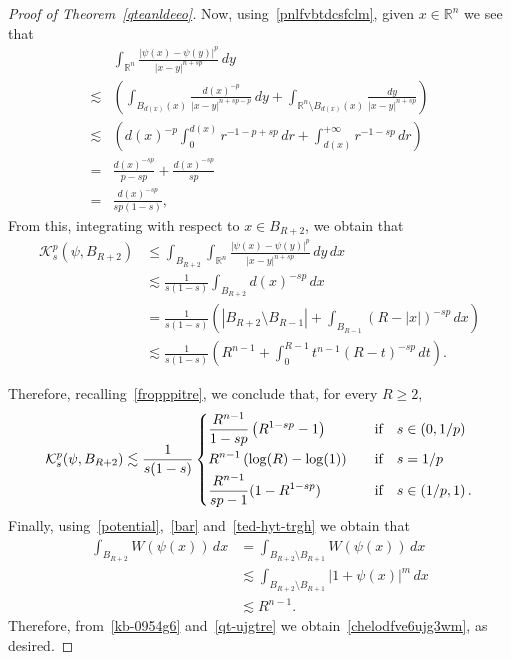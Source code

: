 \documentclass[12pt]{article}
\newcommand{\R}{\mathbb{R}}
\numberwithin{equation}{section}
\renewcommand{\leq}{\leqslant}
\renewcommand{\geq}{\geqslant}
\begin{document}
\begin{proof}[Proof of Theorem~\ref{qteanldeeo}]
Now, using~\eqref{pnlfvbtdcsfclm}, given $x\in\R^n$ we see that
\begin{equation*}
\begin{split}
&\int_{\R^n}\frac{\left|\psi(x)-\psi(y)\right|^p}{\left|x-y\right|^{n+sp}}\,dy\\
\lesssim & \left(\int_{B_{d(x)}(x)} \frac{d(x)^{-p}}{\left|x-y\right|^{n+sp-p}}\,dy+\int_{\R^n\setminus B_{d(x)}(x)} \frac{dy}{\left|x-y\right|^{n+sp}}\right)\\
\lesssim & \left( d(x)^{-p} \int_{0}^{d(x)}r^{-1-p+sp}\,dr+\int_{d(x)}^{+\infty} r^{-1-sp}\,dr\right) \\
=& \frac{d(x)^{-sp}}{p-sp} + \frac{d(x)^{-sp}}{sp} \\  
=& \frac{d(x)^{-sp}}{sp(1-s)},
\end{split}
\end{equation*}
From this, integrating with respect to $x\in B_{R+2}$, we obtain that
\begin{equation*}
\begin{split}
\mathcal{K}_s^p(\psi,B_{R+2}) &\leq \int_{B_{R+2}}\int_{\R^n}\frac{\left|\psi(x)-\psi(y)\right|^p}{\left|x-y\right|^{n+sp}}\,dy\,dx\\
&\lesssim\frac{1}{s(1-s)}\int_{B_{R+2}}d(x)^{-sp}\,dx\\
&= \frac{1}{s(1-s)}\left(\left|B_{R+2}\setminus B_{R-1}\right| +\int_{B_{R-1}}\left(R-\left|x\right|\right)^{-sp}\,dx\right)\\
&\lesssim \frac{1}{s(1-s)}\left( R^{n-1}+ \int_{0}^{R-1}t^{n-1}\left(R-t\right)^{-sp}\,dt\right).
\end{split}
\end{equation*}

Therefore, recalling~\eqref{fropppitre}, we conclude  that, for every $R\geq 2$, 
\begin{equation}\label{kb-0954g6}
\mathcal{K}_s^p(\psi,B_{R+2})\lesssim \frac{1}{s(1-s)}\begin{dcases}
\frac{R^{n-1}}{1-sp} \left(R^{1-sp}-1\right)\quad &\mbox{if}\quad s\in \left(0,1/p\right)\\
R^{n-1} \left(\log(R)-\log(1)\right)\quad &\mbox{if}\quad s=1/p\\
\frac{R^{n-1}}{sp-1}(1-R^{1-sp})\quad &\mbox{if}\quad s\in \left(1/p,1\right).
\end{dcases}
\end{equation} 
Finally, using~\eqref{potential},~\eqref{bar} and~\eqref{ted-hyt-trgh} we obtain that 
\begin{equation}\label{qt-ujgtre}
\begin{split}
\int_{B_{R+2}}W(\psi(x))\,dx &=\int_{B_{R+2}\setminus B_{R+1}}W(\psi(x))\,dx\\
&\lesssim  \int_{B_{R+2}\setminus B_{R+1}}\left|1+\psi(x)\right|^m\,dx\\
&\lesssim R^{n-1}.
\end{split}
\end{equation}
Therefore, from~\eqref{kb-0954g6} and~\eqref{qt-ujgtre} we obtain~\eqref{chelodfve6ujg3wm}, as desired.\end{proof}
\end{document}
